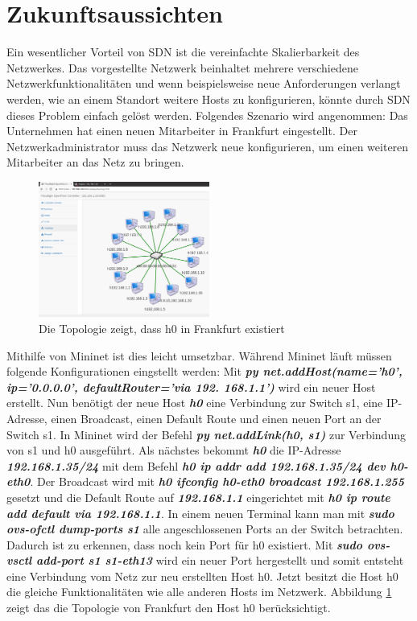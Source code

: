 \documentclass[fontsize=12pt,paper=a4,open=any,parskip=half,
  twoside=false,toc=listof,toc=bibliography,fleqn,leqno,
  captions=nooneline,captions=tableabove,british]{scrbook}
\begin{document}
{\section{Zukunftsaussichten}

Ein wesentlicher Vorteil von SDN ist die vereinfachte Skalierbarkeit des Netzwerkes. Das vorgestellte Netzwerk beinhaltet mehrere verschiedene Netzwerkfunktionalitäten und wenn beispielsweise neue Anforderungen verlangt werden, wie an einem Standort weitere Hosts zu konfigurieren, könnte durch SDN dieses Problem einfach gelöst werden. Folgendes Szenario wird angenommen: Das Unternehmen hat einen neuen Mitarbeiter in Frankfurt eingestellt. Der Netzwerkadministrator muss das Netzwerk neue konfigurieren, um einen weiteren Mitarbeiter an das Netz zu bringen.

\begin{figure}
	\vspace{-\baselineskip}
	\centering
	\includegraphics[width=0.5\textwidth]{Bilder/neuetopo}
	\caption{Die Topologie zeigt, dass h0 in Frankfurt existiert}
	\label{neutopo}
\end{figure}
Mithilfe von Mininet ist dies leicht umsetzbar. Während Mininet läuft müssen folgende Konfigurationen eingstellt werden: Mit \textit{\textbf{py net.addHost(name='h0', ip='0.0.0.0', defaultRouter='via 192. 168.1.1')}} wird ein neuer Host erstellt. Nun benötigt der neue Host \textit{\textbf{h0}} eine Verbindung zur Switch s1, eine IP-Adresse, einen Broadcast, einen Default Route und einen neuen Port an der Switch s1. In Mininet wird der Befehl \textit{\textbf{py net.addLink(h0, s1)}} zur Verbindung von s1 und h0 ausgeführt. Als nächstes bekommt \textit{\textbf{h0}} die IP-Adresse \textit{\textbf{192.168.1.35/24}} mit dem Befehl 
\textit{\textbf{h0 ip addr add 192.168.1.35/24 dev h0-eth0}}. Der Broadcast wird mit \textit{\textbf{h0 ifconfig h0-eth0 broadcast 192.168.1.255}} gesetzt und die Default Route auf \textit{\textbf{192.168.1.1}} eingerichtet mit \textit{\textbf{h0 ip route add default via 192.168.1.1}}. In einem neuen Terminal  kann man mit  \textit{\textbf{sudo ovs-ofctl dump-ports s1}} alle angeschlossenen Ports an der Switch betrachten. Dadurch ist zu erkennen, dass noch kein Port für h0 existiert. Mit \textit{\textbf{sudo ovs-vsctl add-port s1 s1-eth13}} wird ein neuer Port hergestellt und somit entsteht eine Verbindung vom Netz zur neu erstellten Host h0. Jetzt besitzt die Host h0 die gleiche Funktionalitäten wie alle anderen Hosts im Netzwerk. Abbildung \ref{neutopo} zeigt das die Topologie von Frankfurt den Host h0 berücksichtigt. \par

}
\end{document}
